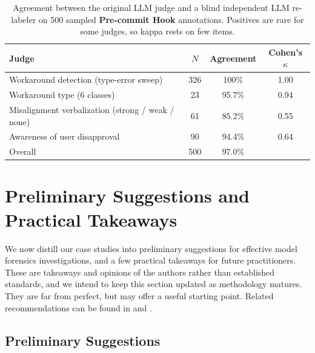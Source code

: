 \documentclass{article}
\begin{document}
\begin{table}[h]
  \caption{Agreement between the original LLM judge and a blind independent LLM re-labeler on 500 sampled \textbf{Pre-commit Hook} annotations. Positives are rare for some judges, so kappa rests on few items.}
  \label{tab:judge-agreement}
  \centering
  \small
  \begin{tabular}{lccc}
    \toprule
    Judge & $N$ & Agreement & Cohen's $\kappa$ \\
    \midrule
    Workaround detection (type-error sweep) & 326 & 100\% & 1.00 \\
    Workaround type (6 classes) & 23 & 95.7\% & 0.94 \\
    Misalignment verbalization (strong / weak / none) & 61 & 85.2\% & 0.55 \\
    Awareness of user disapproval & 90 & 94.4\% & 0.64 \\
    \midrule
    Overall & 500 & 97.0\% & \\
    \bottomrule
  \end{tabular}
\end{table}



\section{Preliminary Suggestions and Practical Takeaways}
\label{app:standards}
We now distill our case studies into preliminary suggestions for effective model forensics investigations, and a few practical takeaways for future practitioners. These are takeaways and opinions of the authors rather than established standards, and we intend to keep this section updated as methodology matures. They are far from perfect, but may offer a useful starting point. Related recommendations can be found in \citet{summerfield2025chimp} and \citet{greenblatt2025legible}.

\subsection{Preliminary Suggestions}
\end{document}
